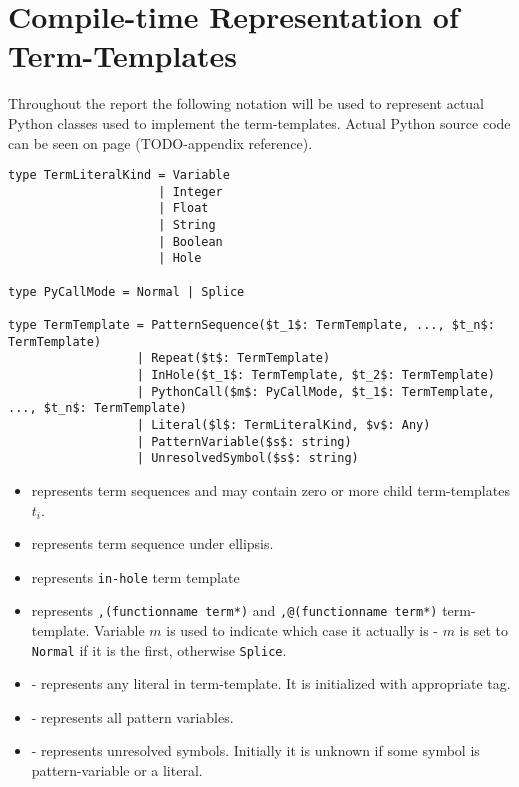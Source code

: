\section{Compile-time Representation of Term-Templates}

Throughout the report the following notation will be used to represent actual Python classes used to implement the term-templates. Actual Python source code can be seen on page (TODO-appendix reference). 


\begin{lstlisting}
type TermLiteralKind = Variable
                     | Integer 
                     | Float 
                     | String
                     | Boolean
                     | Hole

type PyCallMode = Normal | Splice  

type TermTemplate = PatternSequence($t_1$: TermTemplate, ..., $t_n$: TermTemplate)
                  | Repeat($t$: TermTemplate)
                  | InHole($t_1$: TermTemplate, $t_2$: TermTemplate)
                  | PythonCall($m$: PyCallMode, $t_1$: TermTemplate, ..., $t_n$: TermTemplate)
                  | Literal($l$: TermLiteralKind, $v$: Any)
                  | PatternVariable($s$: string)
                  | UnresolvedSymbol($s$: string)
\end{lstlisting}

\begin{itemize}
\item \TermSequence represents term sequences and may contain zero or more child term-templates $t_i$.
\item \TermRepeat represents term sequence under ellipsis.
\item \TermInHole represents \lstinline{in-hole} term template
\item \PythonCall represents \lstinline{,(functionname term*)} and \lstinline{,@(functionname term*)} term-template. Variable $m$ is used to indicate which case it actually is - $m$ is set to \lstinline{Normal} if it is the first, otherwise \lstinline{Splice}.
\item \TermLiteral - represents any literal in term-template. It is initialized with appropriate tag.
\item \PatternVariable - represents all pattern variables.
\item \TermUnresolvedSymbol - represents unresolved symbols. Initially it is unknown if some symbol is pattern-variable or a literal.
\end{itemize}

